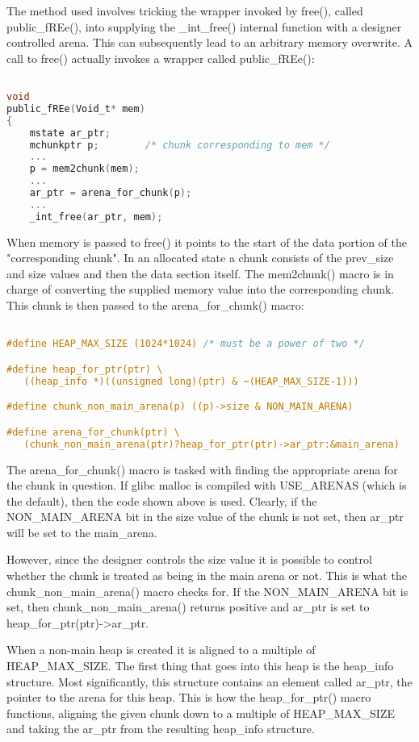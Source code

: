 \documentclass[12pt]{article}
\begin{document}
The method used involves tricking the wrapper invoked by free(),
called public_fREe(), into supplying the _int_free() internal
function with a designer controlled arena. This can subsequently
lead to an arbitrary memory overwrite. A call to free() actually
invokes a wrapper called public_fREe():
\begin{lstlisting}[language=C]

void
public_fREe(Void_t* mem)
{
    mstate ar_ptr;
    mchunkptr p;        /* chunk corresponding to mem */
    ...
    p = mem2chunk(mem);
    ...
    ar_ptr = arena_for_chunk(p);
    ...
    _int_free(ar_ptr, mem);
\end{lstlisting}
When memory is passed to free() it points to the start of the data
portion of the "corresponding chunk". In an allocated state a chunk
consists of the prev_size and size values and then the data section
itself. The mem2chunk() macro is in charge of converting the
supplied memory value into the corresponding chunk. This chunk is
then passed to the arena_for_chunk() macro:
\begin{lstlisting}[language=C]

#define HEAP_MAX_SIZE (1024*1024) /* must be a power of two */

#define heap_for_ptr(ptr) \
   ((heap_info *)((unsigned long)(ptr) & ~(HEAP_MAX_SIZE-1)))

#define chunk_non_main_arena(p) ((p)->size & NON_MAIN_ARENA)

#define arena_for_chunk(ptr) \
   (chunk_non_main_arena(ptr)?heap_for_ptr(ptr)->ar_ptr:&main_arena)
\end{lstlisting}
The arena_for_chunk() macro is tasked with finding the appropriate
arena for the chunk in question. If glibc malloc is compiled with
USE_ARENAS (which is the default), then the code shown above is
used. Clearly, if the NON_MAIN_ARENA bit in the size value of the
chunk is not set, then ar_ptr will be set to the main_arena.

However, since the designer controls the size value it is possible
to control whether the chunk is treated as being in the main arena
or not. This is what the chunk_non_main_arena() macro checks for.
If the NON_MAIN_ARENA bit is set, then chunk_non_main_arena()
returns positive and ar_ptr is set to heap_for_ptr(ptr)->ar_ptr.

When a non-main heap is created it is aligned to a multiple of
HEAP_MAX_SIZE. The first thing that goes into this heap is the
heap_info structure. Most significantly, this structure contains an
element called ar_ptr, the pointer to the arena for this heap. This
is how the heap_for_ptr() macro functions, aligning the given chunk
down to a multiple of HEAP_MAX_SIZE and taking the ar_ptr from the
resulting heap_info structure.
\end{document}
